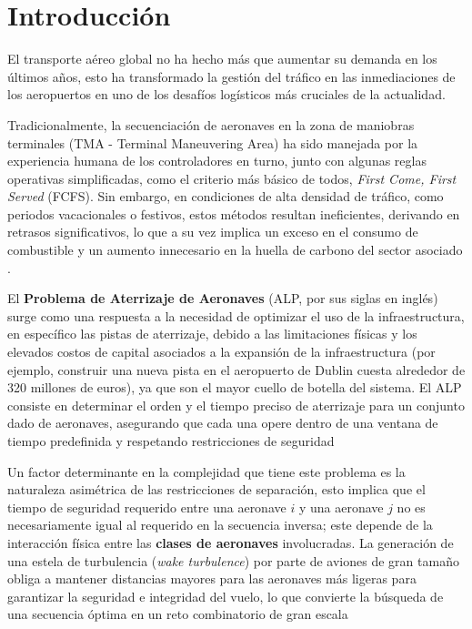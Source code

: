 \documentclass[letter, 10pt]{article}
\begin{document}
\section{Introducci\'on}

El transporte a\'ereo global no ha hecho m\'as que aumentar su demanda en los \'ultimos a\~nos, esto ha transformado la gesti\'on del tr\'afico en las inmediaciones de los aeropuertos en uno de los desaf\'ios log\'isticos m\'as cruciales de la actualidad.

Tradicionalmente, la secuenciaci\'on de aeronaves en la zona de maniobras terminales (TMA - Terminal Maneuvering Area) ha sido manejada por la experiencia humana de los controladores en turno, junto con algunas reglas operativas simplificadas, como el criterio m\'as b\'asico de todos, \textit{First Come, First Served} (FCFS). Sin embargo, en condiciones de alta densidad de tr\'afico, como periodos vacacionales o festivos, estos m\'etodos resultan ineficientes, derivando en retrasos significativos, lo que a su vez implica un exceso en el consumo de combustible y un aumento innecesario en la huella de carbono del sector asociado \cite{messaoud2020}.

El \textbf{Problema de Aterrizaje de Aeronaves} (ALP, por sus siglas en ingl\'es) surge como una respuesta a la necesidad de optimizar el uso de la infraestructura, en espec\'ifico las pistas de aterrizaje, debido a las limitaciones f\'isicas y los elevados costos de capital asociados a la expansi\'on de la infraestructura (por ejemplo, construir una nueva pista en el aeropuerto de Dublin cuesta alrededor de 320 millones de euros)\cite{caswell2016}, ya que son el mayor cuello de botella del sistema. El ALP consiste en determinar el orden y el tiempo preciso de aterrizaje para un conjunto dado de aeronaves, asegurando que cada una opere dentro de una ventana de tiempo predefinida y respetando restricciones de seguridad \cite{beasley2000}

Un factor determinante en la complejidad que tiene este problema es la naturaleza asim\'etrica de las restricciones de separaci\'on, esto implica que el tiempo de seguridad requerido entre una aeronave $i$ y una aeronave $j$ no es necesariamente igual al requerido en la secuencia inversa; este depende de la interacci\'on f\'isica entre las \textbf{clases de aeronaves} involucradas. La generaci\'on de una estela de turbulencia (\textit{wake turbulence}) por parte de aviones de gran tama\~no obliga a mantener distancias mayores para las aeronaves m\'as ligeras para garantizar la seguridad e integridad del vuelo, lo que convierte la b\'usqueda de una secuencia \'optima en un reto combinatorio de gran escala \cite{beasley2000}
\end{document}
